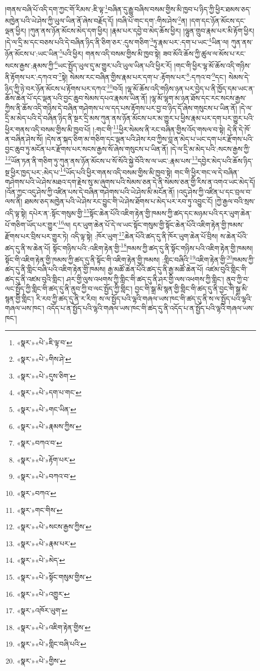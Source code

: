 །གནས་བཞི་པོ་འདི་དག་ཀྱང་གོ་རིམས་:ཇི་ལྟ་\footnote{«སྣར་»«པེ་»ཇི་ལྟ་བ་}བཞིན་དུ་རྒྱུ་བཞིས་བསམ་གྱིས་མི་ཁྱབ་པ་ཉིད་ཀྱི་ཕྱིར་ཐམས་ཅད་མཁྱེན་པའི་ཡེ་ཤེས་ཀྱི་ཡུལ་ཡིན་ནོ་ཞེས་བརྗོད་དོ། །བཞི་པོ་གང་དག་:གིས་ཤེས་\footnote{«སྣར་»«པེ་»གིས་ཤེ་}ན། །དག་དང་ཉོན་མོངས་དང་ལྡན་ཕྱིར། །ཀུན་ནས་ཉོན་མོངས་མེད་དག་ཕྱིར། །རྣམ་པར་དབྱེ་བ་མེད་ཆོས་ཕྱིར། །ལྷུན་གྲུབ་རྣམ་པར་མི་རྟོག་ཕྱིར། །དེ་ལ་དྲི་མ་དང་བཅས་པའི་དེ་བཞིན་ཉིད་ནི་ཅིག་ཅར་:དུས་གཅིག་\footnote{«སྣར་»«པེ་»དུས་ཅིག་}ཏུ་རྣམ་པར་:དག་པ་ཡང་\footnote{«སྣར་»«པེ་»དག་པ་གང་}ཡིན་ལ། ཀུན་ནས་ཉོན་མོངས་པ་:ཡང་ཡིན་\footnote{«སྣར་»«པེ་»གང་ཡིན་}པའི་ཕྱིར། གནས་འདི་བསམ་གྱིས་མི་ཁྱབ་སྟེ། ཟབ་མོའི་ཆོས་ཀྱི་ཚུལ་ལ་མོས་པ་རང་སངས་རྒྱས་:རྣམས་ཀྱི་\footnote{«སྣར་»«པེ་»རྣམས་ཀྱིས་}ཡང་སྤྱོད་ཡུལ་དུ་མ་གྱུར་པའི་ཡུལ་ཡིན་པའི་ཕྱིར་རོ། །གང་གི་ཕྱིར་ལྷ་མོ་ཆོས་འདི་གཉིས་ནི་རྟོགས་པར་:དཀའ་བ་\footnote{«སྣར་»བཀའ་བ་}སྟེ། སེམས་རང་བཞིན་གྱིས་རྣམ་པར་དག་པ་:རྟོགས་པར་\footnote{«སྣར་»«པེ་»རྟོག་པར་}:དཀའ་བ་\footnote{«སྣར་»«པེ་»བཀའ་བ་}དང་། སེམས་དེ་ཉིད་ཀྱི་ཉེ་བར་ཉོན་མོངས་པ་རྟོགས་པར་དཀའ་\footnote{«སྣར་»བཀའ་}བའོ། །ལྷ་མོ་ཆོས་འདི་གཉིས་ཉན་པར་བྱེད་པ་ནི་ཁྱོད་དམ་ཡང་ན་ཆོས་ཆེན་པོ་དང་ལྡན་པའི་བྱང་ཆུབ་སེམས་དཔའ་རྣམས་ཡིན་ནོ། །ལྷ་མོ་ལྷག་མ་ཉན་ཐོས་དང་རང་སངས་རྒྱས་ཀྱིས་ནི་ཆོས་འདི་གཉིས་དེ་བཞིན་གཤེགས་པ་ལ་དད་པས་རྟོགས་པར་བྱ་བ་ཉིད་དོ་ཞེས་གསུངས་པ་ཡིན་ནོ། །དེ་ལ་དྲི་མ་མེད་པའི་དེ་བཞིན་ཉིད་ནི་སྔར་དྲི་མས་ཀུན་ནས་ཉོན་མོངས་པར་མ་གྱུར་པ་ཕྱིས་རྣམ་པར་དག་པར་གྱུར་པའི་ཕྱིར་གནས་འདི་བསམ་གྱིས་མི་ཁྱབ་པོ། །:གང་གི་\footnote{«སྣར་»གང་གིས་}ཕྱིར་སེམས་ནི་རང་བཞིན་གྱིས་འོད་གསལ་བ་སྟེ། དེ་ནི་དེ་ཁོ་ན་བཞིན་ཤེས་སོ། །དེས་ན་སྐད་ཅིག་མ་གཅིག་དང་ལྡན་པའི་ཤེས་རབ་ཀྱིས་བླ་ན་མེད་པ་ཡང་དག་པར་རྫོགས་པའི་བྱང་ཆུབ་ཏུ་མངོན་པར་རྫོགས་པར་སངས་རྒྱས་སོ་ཞེས་གསུངས་པ་ཡིན་ནོ། །དེ་ལ་དྲི་མ་མེད་པའི་:སངས་རྒྱས་ཀྱི་\footnote{«སྣར་»«པེ་»སངས་རྒྱས་ཀྱིས་}ཡོན་ཏན་ནི་གཅིག་ཏུ་ཀུན་ནས་ཉོན་མོངས་པ་སོ་སོའི་སྐྱེ་བོའི་ས་ལ་ཡང་:རྣམ་པས་\footnote{«སྣར་»«པེ་»རྣམ་པར་}དབྱེར་མེད་པའི་ཆོས་ཉིད་སྔ་ཕྱིར་ཁྱད་པར་:མེད་པ་\footnote{«སྣར་»«པེ་»མེད་}ཡོད་པའི་ཕྱིར་གནས་འདི་བསམ་གྱིས་མི་ཁྱབ་སྟེ། གང་གི་ཕྱིར་གང་ལ་དེ་བཞིན་གཤེགས་པའི་ཡེ་ཤེས་མཐའ་དག་རྗེས་སུ་མ་ཞུགས་པའི་སེམས་ཅན་དེ་ནི་སེམས་ཅན་གྱི་རིས་ན་འགའ་ཡང་མེད་དོ། །འོན་ཀྱང་འདུ་ཤེས་ཀྱི་འཛིན་པས་དེ་བཞིན་གཤེགས་པའི་ཡེ་ཤེས་མི་མངོན་ནོ། །འདུ་ཤེས་ཀྱི་འཛིན་པ་དང་བྲལ་བ་ལས་ནི། ཐམས་ཅད་མཁྱེན་པའི་ཡེ་ཤེས་རང་བྱུང་གི་ཡེ་ཤེས་ཐོགས་པ་མེད་པར་རབ་ཏུ་འབྱུང་ངོ། །ཀྱེ་རྒྱལ་བའི་སྲས་འདི་ལྟ་སྟེ། དཔེར་ན་:སྟོང་གསུམ་གྱི་\footnote{«སྣར་»«པེ་»སྟོང་གསུམ་གྱིས་}སྟོང་ཆེན་པོའི་འཇིག་རྟེན་གྱི་ཁམས་ཀྱི་ཚད་དང་མཉམ་པའི་དར་ཡུག་ཆེན་པོ་གཅིག་ཡོད་པར་གྱུར་\footnote{«སྣར་»«པེ་»འགྱུར་}ལ། དར་ཡུག་ཆེན་པོ་དེ་ལ་ཡང་སྟོང་གསུམ་གྱི་སྟོང་ཆེན་པོའི་འཇིག་རྟེན་གྱི་ཁམས་རྫོགས་པར་བྲིས་པར་གྱུར་ཏེ། འདི་ལྟ་སྟེ། :ཁོར་ཡུག་\footnote{«སྣར་»འཁོར་ཡུག་}ཆེན་པོའི་ཚད་དུ་ནི་ཁོར་ཡུག་ཆེན་པོ་བྲིས། ས་ཆེན་པོའི་ཚད་དུ་ནི་ས་ཆེན་པོ། སྟོང་གཉིས་པའི་:འཇིག་རྟེན་གྱི་\footnote{«སྣར་»«པེ་»འཇིག་རྟེན་གྱིས་}ཁམས་ཀྱི་ཚད་དུ་ནི་སྟོང་གཉིས་པའི་འཇིག་རྟེན་གྱི་ཁམས། སྟོང་གི་འཇིག་རྟེན་གྱི་ཁམས་ཀྱི་ཚད་དུ་ནི་སྟོང་གི་འཇིག་རྟེན་གྱི་ཁམས། :གླིང་བཞིའི་\footnote{«སྣར་»«པེ་»གླིང་བཞི་པའི་}འཇིག་རྟེན་གྱི་\footnote{«སྣར་»«པེ་»གྱིས་}ཁམས་ཀྱི་ཚད་དུ་ནི་གླིང་བཞི་པའི་འཇིག་རྟེན་གྱི་ཁམས། རྒྱ་མཚོ་ཆེན་པོའི་ཚད་དུ་ནི་རྒྱ་མཚོ་ཆེན་པོ། འཛམ་བུའི་གླིང་གི་ཚད་དུ་ནི་འཛམ་བུའི་གླིང་། ཤར་གྱི་ལུས་འཕགས་ཀྱི་གླིང་གི་ཚད་དུ་ནི་ཤར་གྱི་ལས་འཕགས་ཀྱི་གླིང་། ནུབ་ཀྱི་བ་ལང་སྤྱོད་ཀྱི་གླིང་གི་ཚད་དུ་ནི་ནུབ་ཀྱི་བ་ལང་སྤྱོད་ཀྱི་གླིང་། བྱང་གི་སྒྲ་མི་སྙན་གྱི་གླིང་གི་ཚད་དུ་ནི་བྱང་གི་སྒྲ་མི་སྙན་གྱི་གླིང་། རི་རབ་ཀྱི་ཚད་དུ་ནི་ར་རིབ། ས་ལ་སྤྱོད་པའི་ལྷའི་གཞལ་ཡས་ཁང་གི་ཚད་དུ་ནི་ས་ལ་སྤྱོད་པའི་ལྷའི་གཞལ་ཡས་ཁང་། འདོད་པ་ན་སྤྱོད་པའི་ལྷའི་གཞལ་ཡས་ཁང་གི་ཚད་དུ་ནི་འདོད་པ་ན་སྤྱོད་པའི་ལྷའི་གཞལ་ཡས་ཁང་། 